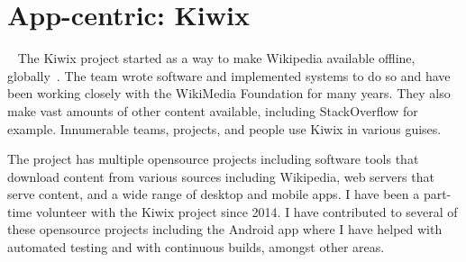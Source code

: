 \clearpage


\section{App-centric: Kiwix}~\label{case-study-overview-kiwix}
The Kiwix project started as a way to make Wikipedia available offline, globally~. The team wrote software and implemented systems to do so and have been working closely with the WikiMedia Foundation for many years. They also make vast amounts of other content available, including StackOverflow for example. Innumerable teams, projects, and people use Kiwix in various guises.

The project has multiple opensource projects including software tools that download content from various sources including Wikipedia, web servers that serve content, and a wide range of desktop and mobile apps. I have been a part-time volunteer with the Kiwix project since 2014. I have contributed to several of these opensource projects including the Android app where I have helped with automated testing and with continuous builds, amongst other areas.

